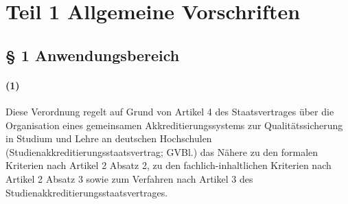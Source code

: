 \documentclass[a4paper]{scrartcl}
\begin{document}





\newpage
\tableofcontents

\clearpage
\section{Teil 1 Allgemeine Vorschriften}

\subsection{§ 1 Anwendungsbereich}
\paragraph{(1)} Diese Verordnung regelt auf Grund von Artikel 4 des Staatsvertrages über die Organisation eines gemeinsamen Akkreditierungssystems zur Qualitätssicherung in Studium und Lehre an deutschen Hochschulen (Studienakkreditierungsstaatsvertrag; GVBl.) das Nähere zu den formalen Kriterien nach Artikel 2 Absatz 2, zu den fachlich-inhaltlichen Kriterien nach Artikel 2 Absatz 3 sowie zum Verfahren nach Artikel 3 des Studienakkreditierungsstaatsvertrages.
\end{document}
